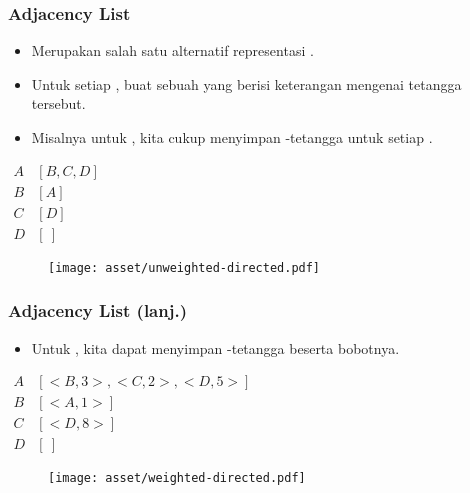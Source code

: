 \begin{frame}
\frametitle{Adjacency List}
\begin{itemize}
  \item Merupakan salah satu alternatif representasi \fgraph.
  \item Untuk setiap \fnode, buat sebuah \flist yang berisi keterangan mengenai tetangga \fnode tersebut.
  \item Misalnya untuk  \fgraph, kita cukup menyimpan \fnode-\fnode tetangga untuk setiap \fnode.
\end{itemize}
\begin{center}
\begin{multicols}{2}
  $\begin{array}{r|l}
    A & [B, C, D] \\
    B & [A] \\
    C & [D] \\
    D & [\ ]
  \end{array}$
  \break
  \begin{figure}
    \texttt{[image: asset/unweighted-directed.pdf]}
  \end{figure}
\end{multicols} 
\end{center}
\end{frame}

\begin{frame}
\frametitle{Adjacency List (lanj.)}
\begin{itemize}
  \item Untuk  \fgraph, kita dapat menyimpan \fnode-\fnode tetangga beserta bobotnya.
\end{itemize}
\begin{center}
\begin{multicols}{2}
  $\begin{array}{r|l}
    A & [<B,3> , <C,2>, <D,5>] \\
    B & [<A,1>] \\
    C & [<D,8>] \\
    D & [\ ]
  \end{array}$
  \break
  \begin{figure}
    \texttt{[image: asset/weighted-directed.pdf]}
  \end{figure}
\end{multicols} 
\end{center}
\end{frame}

